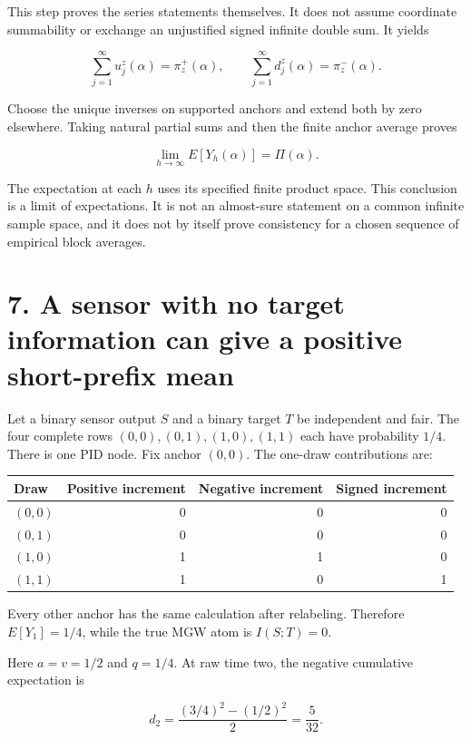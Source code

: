 This step proves the series statements themselves. It does not assume coordinate summability or exchange an unjustified signed infinite double sum. It yields

\[
\sum_{j=1}^{\infty}u_j^z(\alpha)=\pi_z^+(\alpha),
\qquad
\sum_{j=1}^{\infty}d_j^z(\alpha)=\pi_z^-(\alpha).
\]

Choose the unique inverses on supported anchors and extend both by zero elsewhere. Taking natural partial sums and then the finite anchor average proves

\[
\lim_{h\to\infty} E[Y_h(\alpha)]=\Pi(\alpha).
\]

The expectation at each \(h\) uses its specified finite product space. This conclusion is a limit of expectations. It is not an almost-sure statement on a common infinite sample space, and it does not by itself prove consistency for a chosen sequence of empirical block averages.

\section{7. A sensor with no target information can give a positive short-prefix mean}\label{a-sensor-with-no-target-information-can-give-a-positive-short-prefix-mean}

Let a binary sensor output \(S\) and a binary target \(T\) be independent and fair. The four complete rows \((0,0),(0,1),(1,0),(1,1)\) each have probability \(1/4\). There is one PID node. Fix anchor \((0,0)\). The one-draw contributions are:

{\def\LTcaptype{none} %
\begin{longtable}[]{@{}lrrr@{}}
\toprule\noalign{}
Draw & Positive increment & Negative increment & Signed increment \\
\midrule\noalign{}
\endhead
\bottomrule\noalign{}
\endlastfoot
\((0,0)\) & 0 & 0 & 0 \\
\((0,1)\) & 0 & 0 & 0 \\
\((1,0)\) & 1 & 1 & 0 \\
\((1,1)\) & 1 & 0 & 1 \\
\end{longtable}
}

Every other anchor has the same calculation after relabeling. Therefore \(E[Y_1]=1/4\), while the true MGW atom is \(I(S;T)=0\).

Here \(a=v=1/2\) and \(q=1/4\). At raw time two, the negative cumulative expectation is

\[
d_2=\frac{(3/4)^2-(1/2)^2}{2}=\frac5{32}.
\]

